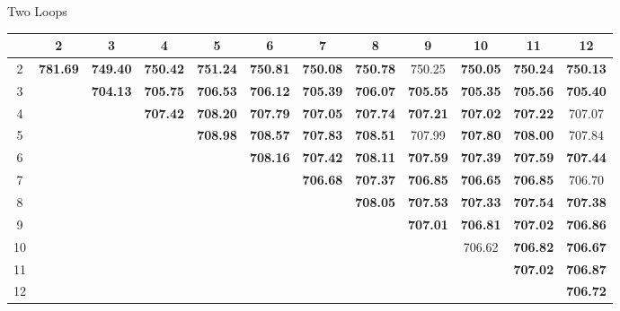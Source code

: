 \documentclass[hyphens,aspectratio=169]{beamer}
\begin{document}
\begin{frame}[fragile]{Two Loops}
	\begin{table}[H]
		\centering
		\begin{adjustbox}{max width=\textwidth,max height=2\textheight}
\begin{tabular}{|c|c|c|c|c|c|c|c|c|c|c|c|}
  \hline
  & 2       & 3       & 4       & 5       & 6       & 7       & 8       & 9       & 10      & 11      & 12      \\
  \hline
  2 & \textbf{781.69} & \textbf{749.40} & \textbf{750.42} & \textbf{751.24} & \textbf{750.81} & \textbf{750.08} & \textbf{750.78} & 750.25 & \textbf{750.05} & \textbf{750.24} & \textbf{750.13} \\
  \hline
  3 &               & \textbf{704.13} & \textbf{705.75} & \textbf{706.53} & \textbf{706.12} & \textbf{705.39} & \textbf{706.07} & \textbf{705.55} & \textbf{705.35} & \textbf{705.56} & \textbf{705.40} \\
  \hline
  4 &               &               & \textbf{707.42} & \textbf{708.20} & \textbf{707.79} & \textbf{707.05} & \textbf{707.74} & \textbf{707.21} & \textbf{707.02} & \textbf{707.22} & 707.07 \\
  \hline
  5 &               &               &               & \textbf{708.98} & \textbf{708.57} & \textbf{707.83} & \textbf{708.51} & 707.99 & \textbf{707.80} & \textbf{708.00} & 707.84 \\
  \hline
  6 &               &               &               &               & \textbf{708.16} & \textbf{707.42} & \textbf{708.11} & \textbf{707.59} & \textbf{707.39} & \textbf{707.59} & \textbf{707.44} \\
  \hline
  7 &               &               &               &               &               & \textbf{706.68} & \textbf{707.37} & \textbf{706.85} & \textbf{706.65} & \textbf{706.85} & 706.70 \\
  \hline
  8 &               &               &               &               &               &               & \textbf{708.05} & \textbf{707.53} & \textbf{707.33} & \textbf{707.54} & \textbf{707.38} \\
  \hline
  9 &               &               &               &               &               &               &               & \textbf{707.01} & \textbf{706.81} & \textbf{707.02} & \textbf{706.86} \\
  \hline
  10 &              &               &               &               &               &               &               &               & 706.62 & \textbf{706.82} & \textbf{706.67} \\
  \hline
  11 &              &               &               &               &               &               &               &               &               & \textbf{707.02} & \textbf{706.87} \\
  \hline
  12 &              &               &               &               &               &               &               &               &               &               & \textbf{706.72} \\
  \hline
\end{tabular}


\end{adjustbox}
\end{table}
\end{frame}
\end{document}
